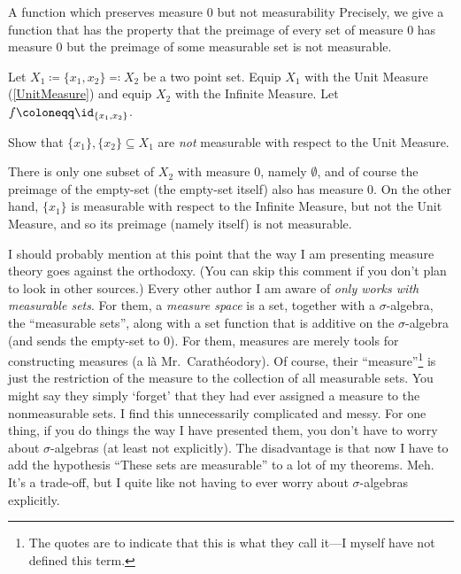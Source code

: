 \begin{exm}{A function which preserves measure $0$ but not measurability}{}
Precisely, we give a function that has the property that the preimage of every set of measure $0$ has measure $0$ but the preimage of some measurable set is not measurable.

Let $X_1\coloneqq \{ x_1,x_2\} \eqqcolon X_2$ be a two point set.  Equip $X_1$ with the Unit Measure (\cref{UnitMeasure}) and equip $X_2$ with the Infinite Measure.  Let $f\coloneqq \id _{\{ x_1,x_2\}}$.
\begin{exr}[breakable=false]{}{}
Show that $\{ x_1\} ,\{ x_2\} \subseteq X_1$ are \emph{not} measurable with respect to the Unit Measure.
\end{exr}

There is only one subset of $X_2$ with measure $0$, namely $\emptyset$, and of course the preimage of the empty-set (the empty-set itself) also has measure $0$.  On the other hand, $\{ x_1\}$ is measurable with respect to the Infinite Measure, but not the Unit Measure, and so its preimage (namely itself) is not measurable.
\end{exm}

\begin{important}
I should probably mention at this point that the way I am presenting measure theory goes against the orthodoxy.  (You can skip this comment if you don't plan to look in other sources.)  Every other author I am aware of \emph{only works with measurable sets}.  For them, a \emph{measure space} is a set, together with a $\sigma$-algebra, the ``measurable sets'', along with a set function that is additive on the $\sigma$-algebra (and sends the empty-set to $0$).  For them, measures are merely tools for constructing measures (a l\`{a} Mr.~Carathéodory).  Of course, their ``measure''\footnote{The quotes are to indicate that this is what they call it---I myself have not defined this term.} is just the restriction of the measure to the collection of all measurable sets.  You might say they simply `forget' that they had ever assigned a measure to the nonmeasurable sets.  I find this unnecessarily complicated and messy.  For one thing, if you do things the way I have presented them, you don't have to worry about $\sigma$-algebras (at least not explicitly).  The disadvantage is that now I have to add the hypothesis ``These sets are measurable'' to a lot of my theorems.  Meh.  It's a trade-off, but I quite like not having to ever worry about $\sigma$-algebras explicitly.
\end{important}

